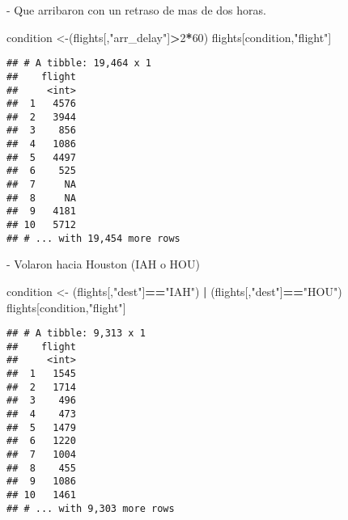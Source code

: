 \documentclass[ignorenonframetext,]{beamer}
\newenvironment{Shaded}{\begin{snugshade}}{\end{snugshade}}
\newcommand{\DecValTok}[1]{\textcolor[rgb]{0.00,0.00,0.81}{#1}}
\newcommand{\NormalTok}[1]{#1}
\newcommand{\OperatorTok}[1]{\textcolor[rgb]{0.81,0.36,0.00}{\textbf{#1}}}
\newcommand{\StringTok}[1]{\textcolor[rgb]{0.31,0.60,0.02}{#1}}
\begin{document}
\begin{frame}[fragile]

\begin{block}{- Que arribaron con un retraso de mas de dos horas.}

\begin{Shaded}
\begin{Highlighting}[]
\NormalTok{condition <-(flights[,}\StringTok{"arr_delay"}\NormalTok{]}\OperatorTok{>}\DecValTok{2}\OperatorTok{*}\DecValTok{60}\NormalTok{)}
\NormalTok{flights[condition,}\StringTok{"flight"}\NormalTok{]}
\end{Highlighting}
\end{Shaded}

\begin{verbatim}
## # A tibble: 19,464 x 1
##    flight
##     <int>
##  1   4576
##  2   3944
##  3    856
##  4   1086
##  5   4497
##  6    525
##  7     NA
##  8     NA
##  9   4181
## 10   5712
## # ... with 19,454 more rows
\end{verbatim}

\end{block}

\end{frame}

\begin{frame}[fragile]

\begin{block}{- Volaron hacia Houston (IAH o HOU)}

\begin{Shaded}
\begin{Highlighting}[]
\NormalTok{condition <-}
\StringTok{  }\NormalTok{(flights[,}\StringTok{"dest"}\NormalTok{]}\OperatorTok{==}\StringTok{"IAH"}\NormalTok{) }\OperatorTok{|}\StringTok{ }
\StringTok{  }\NormalTok{(flights[,}\StringTok{"dest"}\NormalTok{]}\OperatorTok{==}\StringTok{"HOU"}\NormalTok{)}
\NormalTok{flights[condition,}\StringTok{"flight"}\NormalTok{]}
\end{Highlighting}
\end{Shaded}

\begin{verbatim}
## # A tibble: 9,313 x 1
##    flight
##     <int>
##  1   1545
##  2   1714
##  3    496
##  4    473
##  5   1479
##  6   1220
##  7   1004
##  8    455
##  9   1086
## 10   1461
## # ... with 9,303 more rows
\end{verbatim}

\end{block}

\end{frame}
\end{document}
